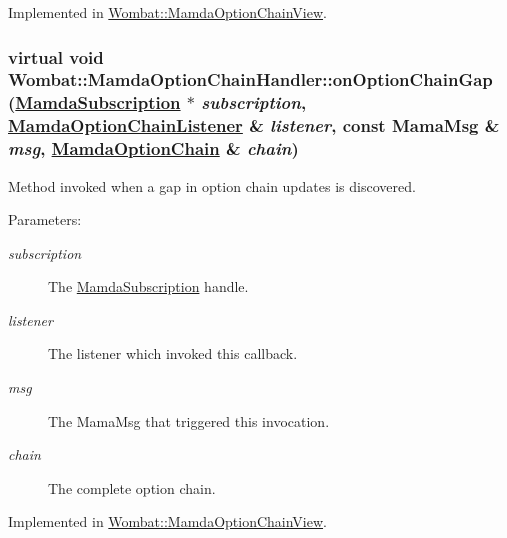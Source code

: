 Implemented in \hyperlink{classWombat_1_1MamdaOptionChainView_749c42258d71ce7e20d6d2cd71b22d13}{Wombat::Mamda\-Option\-Chain\-View}.\hypertarget{classWombat_1_1MamdaOptionChainHandler_336567cf64826492141bbd7eb010b840}{
\subsubsection[onOptionChainGap]{\setlength{\rightskip}{0pt plus 5cm}virtual void Wombat::Mamda\-Option\-Chain\-Handler::on\-Option\-Chain\-Gap (\hyperlink{classWombat_1_1MamdaSubscription}{Mamda\-Subscription} $\ast$ {\em subscription}, \hyperlink{classWombat_1_1MamdaOptionChainListener}{Mamda\-Option\-Chain\-Listener} \& {\em listener}, const Mama\-Msg \& {\em msg}, \hyperlink{classWombat_1_1MamdaOptionChain}{Mamda\-Option\-Chain} \& {\em chain})}}
\label{classWombat_1_1MamdaOptionChainHandler_336567cf64826492141bbd7eb010b840}


Method invoked when a gap in option chain updates is discovered. 

\begin{Desc}
\item[Parameters:]
\begin{description}
\item[{\em subscription}]The \hyperlink{classWombat_1_1MamdaSubscription}{Mamda\-Subscription} handle. \item[{\em listener}]The listener which invoked this callback. \item[{\em msg}]The Mama\-Msg that triggered this invocation. \item[{\em chain}]The complete option chain. \end{description}
\end{Desc}


Implemented in \hyperlink{classWombat_1_1MamdaOptionChainView_989c1ca9d94e400765440ced2b9ba9a0}{Wombat::Mamda\-Option\-Chain\-View}.